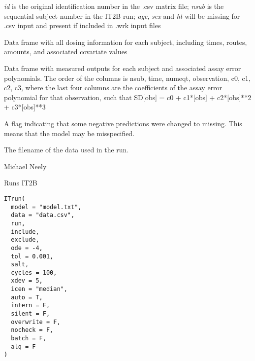 \documentclass[a4paper]{book}
\begin{document}
\begin{Value}
\begin{ldescription}
\emph{id} is the original identification number in the .csv matrix file;
\emph{nsub} is the sequential subject number in the IT2B run; \emph{age},
\emph{sex} and \emph{ht} will be missing for .csv input and present if included in .wrk input files
\item[\code{dosecov }] Data frame with all dosing information for each subject,  including times,  routes,  amounts,  and associated covariate values
\item[\code{outputs }] Data frame with measured outputs for each subject and associated assay error polynomials.
The order of the columns is nsub, time, numeqt, observation, c0, c1, c2, c3, where the last
four columns are the coefficients of the assay error polynomial for that observation, such that
SD[obs] = c0 + c1*[obs] + c2*[obs]**2 + c3*[obs]**3
\item[\code{negflag }] A flag indicating that some negative predictions were changed to missing.
This means that the model may be misspecified.
\item[\code{mdata }] The filename of the data used in the run.
\end{ldescription}
\end{Value}
%
\begin{Author}\relax
Michael Neely
\end{Author}
%
\begin{Description}\relax
Runs IT2B
\end{Description}
%
\begin{Usage}
\begin{verbatim}
ITrun(
  model = "model.txt",
  data = "data.csv",
  run,
  include,
  exclude,
  ode = -4,
  tol = 0.001,
  salt,
  cycles = 100,
  xdev = 5,
  icen = "median",
  auto = T,
  intern = F,
  silent = F,
  overwrite = F,
  nocheck = F,
  batch = F,
  alq = F
)
\end{verbatim}
\end{Usage}
%
\end{document}
